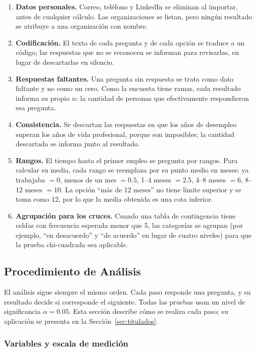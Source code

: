 \documentclass[12pt, a4paper]{article}
\begin{document}
\begin{enumerate}
  \item \textbf{Datos personales.} Correo, teléfono y LinkedIn se
  eliminan al importar, antes de cualquier cálculo. Las organizaciones se
  listan, pero ningún resultado se atribuye a una organización con
  nombre.
  \item \textbf{Codificación.} El texto de cada pregunta y de cada opción
  se traduce a un código; las respuestas que no se reconocen se informan
  para revisarlas, en lugar de descartarlas en silencio.
  \item \textbf{Respuestas faltantes.} Una pregunta sin respuesta se
  trata como dato faltante y no como un cero. Como la encuesta tiene
  ramas, cada resultado informa su propio $n$: la cantidad de personas que
  efectivamente respondieron esa pregunta.
  \item \textbf{Consistencia.} Se descartan las respuestas en que los años
  de desempleo superan los años de vida profesional, porque son
  imposibles; la cantidad descartada se informa junto al resultado.
  \item \textbf{Rangos.} El tiempo hasta el primer empleo se pregunta por
  rangos. Para calcular su media, cada rango se reemplaza por su punto
  medio en meses: ya trabajaba $=0$, menos de un mes $=0.5$, 1--4 meses
  $=2.5$, 4--8 meses $=6$, 8--12 meses $=10$. La opción ``más de 12
  meses'' no tiene límite superior y se toma como 12, por lo que la media
  obtenida es una cota inferior.
  \item \textbf{Agrupación para los cruces.} Cuando una tabla de
  contingencia tiene celdas con frecuencia esperada menor que 5, las
  categorías se agrupan (por ejemplo, ``en desacuerdo'' y ``de acuerdo''
  en lugar de cuatro niveles) para que la prueba chi-cuadrada sea
  aplicable.
\end{enumerate}

\subsection{Procedimiento de Análisis}\label{sec:procedimiento}

El análisis sigue siempre el mismo orden. Cada paso responde una
pregunta, y su resultado decide si corresponde el siguiente. Todas las
pruebas usan un nivel de significancia $\alpha = 0.05$. Esta sección
describe cómo se realiza cada paso; su aplicación se presenta en la
Sección~\ref{sec:titulados}.

\subsubsection{Variables y escala de medición}
\end{document}
